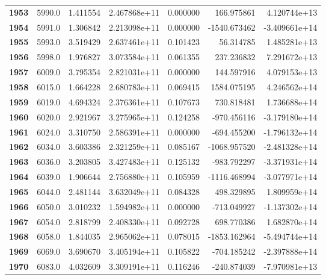 \documentclass{report}[12pt]
\begin{document}
\begin{center}
\begin{tabular}{lrrrrrr}
\textbf{1953} &         5990.0 &   1.411554 &  2.467868e+11 &    0.000000 &   166.975861 &  4.120744e+13 \\
\textbf{1954} &         5991.0 &   1.306842 &  2.213098e+11 &    0.000000 & -1540.673462 & -3.409661e+14 \\
\textbf{1955} &         5993.0 &   3.519429 &  2.637461e+11 &    0.101423 &    56.314785 &  1.485281e+13 \\
\textbf{1956} &         5998.0 &   1.976827 &  3.073584e+11 &    0.061355 &   237.236832 &  7.291672e+13 \\
\textbf{1957} &         6009.0 &   3.795354 &  2.821031e+11 &    0.000000 &   144.597916 &  4.079153e+13 \\
\textbf{1958} &         6015.0 &   1.664228 &  2.680783e+11 &    0.069415 &  1584.075195 &  4.246562e+14 \\
\textbf{1959} &         6019.0 &   4.694324 &  2.376361e+11 &    0.107673 &   730.818481 &  1.736688e+14 \\
\textbf{1960} &         6020.0 &   2.921967 &  3.275965e+11 &    0.124258 &  -970.456116 & -3.179180e+14 \\
\textbf{1961} &         6024.0 &   3.310750 &  2.586391e+11 &    0.000000 &  -694.455200 & -1.796132e+14 \\
\textbf{1962} &         6034.0 &   3.603386 &  2.321259e+11 &    0.085167 & -1068.957520 & -2.481328e+14 \\
\textbf{1963} &         6036.0 &   3.203805 &  3.427483e+11 &    0.125132 &  -983.792297 & -3.371931e+14 \\
\textbf{1964} &         6039.0 &   1.906644 &  2.756880e+11 &    0.105959 & -1116.468994 & -3.077971e+14 \\
\textbf{1965} &         6044.0 &   2.481144 &  3.632049e+11 &    0.084328 &   498.329895 &  1.809959e+14 \\
\textbf{1966} &         6050.0 &   3.010232 &  1.594982e+11 &    0.000000 &  -713.049927 & -1.137302e+14 \\
\textbf{1967} &         6054.0 &   2.818799 &  2.408330e+11 &    0.092728 &   698.770386 &  1.682870e+14 \\
\textbf{1968} &         6058.0 &   1.844035 &  2.965062e+11 &    0.078015 & -1853.162964 & -5.494744e+14 \\
\textbf{1969} &         6069.0 &   3.690670 &  3.405194e+11 &    0.105822 &  -704.185242 & -2.397888e+14 \\
\textbf{1970} &         6083.0 &   4.032609 &  3.309191e+11 &    0.116246 &  -240.874039 & -7.970981e+13 \\

\end{tabular}
\end{center}
\end{document}
